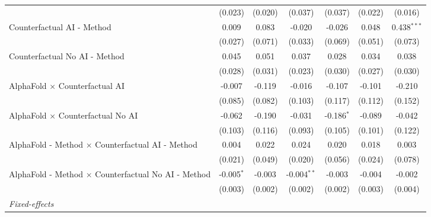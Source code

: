 \begin{tabular}{lcccccc}
                                                              & (0.023)       & (0.020)       & (0.037)       & (0.037)       & (0.022)       & (0.016)\\   
   Counterfactual AI - Method                                 & 0.009         & 0.083         & -0.020        & -0.026        & 0.048         & 0.438$^{***}$\\   
                                                              & (0.027)       & (0.071)       & (0.033)       & (0.069)       & (0.051)       & (0.073)\\   
   Counterfactual No AI - Method                              & 0.045         & 0.051         & 0.037         & 0.028         & 0.034         & 0.038\\   
                                                              & (0.028)       & (0.031)       & (0.023)       & (0.030)       & (0.027)       & (0.030)\\   
   AlphaFold $\times$ Counterfactual AI                       & -0.007        & -0.119        & -0.016        & -0.107        & -0.101        & -0.210\\   
                                                              & (0.085)       & (0.082)       & (0.103)       & (0.117)       & (0.112)       & (0.152)\\   
   AlphaFold $\times$ Counterfactual No AI                    & -0.062        & -0.190        & -0.031        & -0.186$^{*}$  & -0.089        & -0.042\\   
                                                              & (0.103)       & (0.116)       & (0.093)       & (0.105)       & (0.101)       & (0.122)\\   
   AlphaFold - Method $\times$ Counterfactual AI - Method     & 0.004         & 0.022         & 0.024         & 0.020         & 0.018         & 0.003\\   
                                                              & (0.021)       & (0.049)       & (0.020)       & (0.056)       & (0.024)       & (0.078)\\   
   AlphaFold - Method $\times$ Counterfactual No AI - Method  & -0.005$^{*}$  & -0.003        & -0.004$^{**}$ & -0.003        & -0.004        & -0.002\\   
                                                              & (0.003)       & (0.002)       & (0.002)       & (0.002)       & (0.003)       & (0.004)\\   
   \midrule
   \emph{Fixed-effects}\\

\end{tabular}
